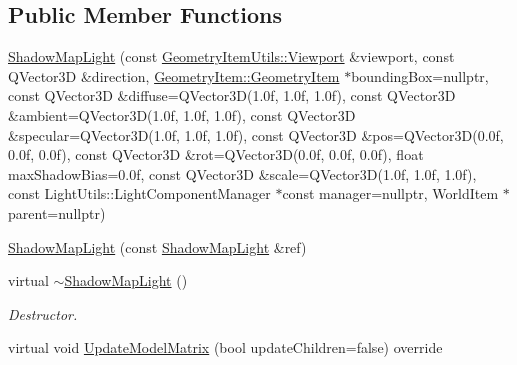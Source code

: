 \subsection*{Public Member Functions}
\begin{DoxyCompactItemize}
\item 
\mbox{\hyperlink{class_geometry_engine_1_1_geometry_world_item_1_1_geometry_light_1_1_shadow_map_light_ad96e826602604d426f22339ff319e1cf}{Shadow\+Map\+Light}} (const \mbox{\hyperlink{class_geometry_engine_1_1_geometry_item_utils_1_1_viewport}{Geometry\+Item\+Utils\+::\+Viewport}} \&viewport, const Q\+Vector3D \&direction, \mbox{\hyperlink{class_geometry_engine_1_1_geometry_world_item_1_1_geometry_item_1_1_geometry_item}{Geometry\+Item\+::\+Geometry\+Item}} $\ast$bounding\+Box=nullptr, const Q\+Vector3D \&diffuse=Q\+Vector3D(1.\+0f, 1.\+0f, 1.\+0f), const Q\+Vector3\+D \&ambient=\+Q\+Vector3\+D(1.\+0f, 1.\+0f, 1.\+0f), const Q\+Vector3\+D \&specular=\+Q\+Vector3\+D(1.\+0f, 1.\+0f, 1.\+0f), const Q\+Vector3\+D \&pos=\+Q\+Vector3\+D(0.\+0f, 0.\+0f, 0.\+0f), const Q\+Vector3\+D \&rot=\+Q\+Vector3\+D(0.\+0f, 0.\+0f, 0.\+0f), float max\+Shadow\+Bias=0.\+0f, const Q\+Vector3\+D \&scale=\+Q\+Vector3\+D(1.\+0f, 1.\+0f, 1.\+0f), const Light\+Utils\+::\+Light\+Component\+Manager $\ast$const manager=nullptr, World\+Item $\ast$parent=nullptr)
\item 
\mbox{\hyperlink{class_geometry_engine_1_1_geometry_world_item_1_1_geometry_light_1_1_shadow_map_light_a2879b30ef1f4ff318fd55f600001f70f}{Shadow\+Map\+Light}} (const \mbox{\hyperlink{class_geometry_engine_1_1_geometry_world_item_1_1_geometry_light_1_1_shadow_map_light}{Shadow\+Map\+Light}} \&ref)
\item 
\mbox{\label{class_geometry_engine_1_1_geometry_world_item_1_1_geometry_light_1_1_shadow_map_light_a1156dcba4ae7c3f9dce061ef9c0b2e7a}} 
virtual \mbox{\hyperlink{class_geometry_engine_1_1_geometry_world_item_1_1_geometry_light_1_1_shadow_map_light_a1156dcba4ae7c3f9dce061ef9c0b2e7a}{$\sim$\+Shadow\+Map\+Light}} ()
\begin{DoxyCompactList}\small\item\em Destructor. \end{DoxyCompactList}\item 
virtual void \mbox{\hyperlink{class_geometry_engine_1_1_geometry_world_item_1_1_geometry_light_1_1_shadow_map_light_a0465932bd0494929e5daa10ce8b77aa6}{Update\+Model\+Matrix}} (bool update\+Children=false) override

\end{DoxyCompactItemize}
